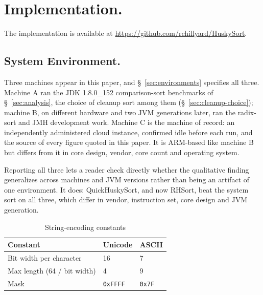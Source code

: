 \documentclass[twoside,leqno,twocolumn]{article}
\newif\ifanonymous
\begin{document}
\section{Implementation.}

\ifanonymous
  The implementation is available in an anonymised repository, linked from the submission site.
\else
  The implementation is available at \url{https://github.com/rchillyard/HuskySort}.
\fi

\subsection{System Environment.}

Three machines appear in this paper, and \S~\ref{sec:environments} specifies all three.
Machine A ran the JDK 1.8.0\_152 comparison-sort benchmarks of \S~\ref{sec:analysis},
the choice of cleanup sort among them (\S~\ref{sec:cleanup-choice});
machine B, on different hardware and two JVM generations later, ran the radix-sort and JMH development work.
Machine C is the machine of record: an independently administered cloud instance, confirmed idle before
each run, and the source of every figure quoted in this paper.
It is ARM-based like machine B but differs from it in core design, vendor, core count and operating system.

Reporting all three lets a reader check directly whether the qualitative finding generalizes across
machines and JVM versions rather than being an artifact of one environment.
It does: QuickHuskySort, and now RHSort, beat the system sort on all three,
which differ in vendor, instruction set, core design and JVM generation.



\begin{table}
  \caption{String-encoding constants}
  \label{tab:EncodingConstants}
  \begin{tabular}{lll}
    \toprule
    Constant & Unicode & ASCII \\
    \midrule
    Bit width per character & 16 & 7 \\
    Max length (64 / bit width) & 4 & 9 \\
    Mask & \texttt{0xFFFF} & \texttt{0x7F} \\
    \bottomrule
  \end{tabular}
\end{table}
\end{document}
